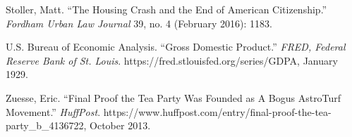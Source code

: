 \documentclass[
]{article}
\begin{document}
\leavevmode\hypertarget{ref-stollerHousingCrashEnd2016}{}%
Stoller, Matt. ``The Housing Crash and the End of American
Citizenship.'' \emph{Fordham Urban Law Journal} 39, no. 4 (February
2016): 1183.

\leavevmode\hypertarget{ref-usbureauofeconomicanalysis1929gross}{}%
U.S. Bureau of Economic Analysis. ``Gross Domestic Product.''
\emph{FRED, Federal Reserve Bank of St. Louis}.
https://fred.stlouisfed.org/series/GDPA, January 1929.

\leavevmode\hypertarget{ref-zuesse2013final}{}%
Zuesse, Eric. ``Final Proof the Tea Party Was Founded as A Bogus
AstroTurf Movement.'' \emph{HuffPost}.
https://www.huffpost.com/entry/final-proof-the-tea-party\_b\_4136722,
October 2013.
\end{document}
